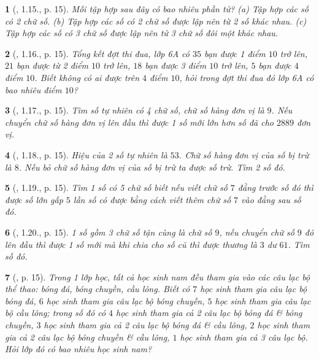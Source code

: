 \documentclass{article}
\newtheorem{baitoan}{}
\begin{document}
\begin{baitoan}[\cite{Binh_boi_duong_Toan_6_tap_1}, 1.15., p. 15]
	Mỗi tập hợp sau đây có bao nhiêu phần tử? (a) Tập hợp các số có 2 chữ số. (b) Tập hợp các số có 2 chữ số được lập nên từ 2 số khác nhau. (c) Tập hợp các số có 3 chữ số được lập nên tử 3 chữ số đôi một khác nhau.
\end{baitoan}

\begin{baitoan}[\cite{Binh_boi_duong_Toan_6_tap_1}, 1.16., p. 15]
	Tổng kết đợt thi đua, lớp 6A có $35$ bạn được 1 điểm $10$ trở lên, $21$ bạn được từ 2 điểm $10$ trở lên, $18$ bạn được 3 điểm $10$ trở lên, $5$ bạn được $4$ điểm $10$. Biết không có ai được trên $4$ điểm $10$, hỏi trong đợt thi đua đó lớp 6A có bao nhiêu điểm $10$?
\end{baitoan}

\begin{baitoan}[\cite{Binh_boi_duong_Toan_6_tap_1}, 1.17., p. 15]
	Tìm số tự nhiên có 4 chữ số, chữ số hàng đơn vị là $9$. Nếu chuyển chữ số hàng đơn vị lên đầu thì được 1 số mới lớn hơn số đã cho $2889$ đơn vị.
\end{baitoan}

\begin{baitoan}[\cite{Binh_boi_duong_Toan_6_tap_1}, 1.18., p. 15]
	Hiệu của 2 số tự nhiên là $53$. Chữ số hàng đơn vị của số bị trừ là $8$. Nếu bỏ chữ số hàng đơn vị của số bị trừ ta được số trừ. Tìm 2 số đó.
\end{baitoan}

\begin{baitoan}[\cite{Binh_boi_duong_Toan_6_tap_1}, 1.19., p. 15]
	Tìm 1 số có 5 chữ số biết nếu viết chữ số $7$ đằng trước số đó thì được số lớn gấp $5$ lần số có được bằng cách viết thêm chữ số $7$ vào đằng sau số đó.
\end{baitoan}

\begin{baitoan}[\cite{Binh_boi_duong_Toan_6_tap_1}, 1.20., p. 15]
	1 số gồm 3 chữ số tận cùng là chữ số $9$, nếu chuyển chữ số $9$ đó lên đầu thì được 1 số mới mà khi chia cho số cũ thì được thương là $3$ dư $61$. Tìm số đó.
\end{baitoan}

\begin{baitoan}[\cite{Binh_boi_duong_Toan_6_tap_1}, p. 15]
	Trong 1 lớp học, tất cả học sinh nam đều tham gia vào các câu lạc bộ thể thao: bóng đá, bóng chuyền, cầu lông. Biết có $7$ học sinh tham gia câu lạc bộ bóng đá, $6$ học sinh tham gia câu lạc bộ bóng chuyền, $5$ học sinh tham gia câu lạc bộ cầu lông; trong số đó có $4$ học sinh tham gia cả 2 câu lạc bộ bóng đá \& bóng chuyền, $3$ học sinh tham gia cả 2 câu lạc bộ bóng đá \& cầu lông, $2$ học sinh tham gia cả 2 câu lạc bộ bóng chuyền \& cầu lông, $1$ học sinh tham gia cả 3 câu lạc bộ. Hỏi lớp đó có bao nhiêu học sinh nam?
\end{baitoan}
\end{document}
